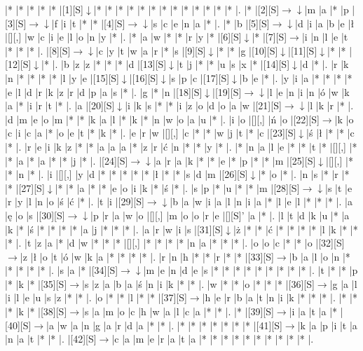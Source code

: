 \documentclass[11pt]{article}
\newcommand\drarr{$\rightarrow \!\!\!\!\! \downarrow$}
\newcommand\rarr{$\rightarrow$}
\newcommand\darr{$\downarrow$}
\begin{document}
\noindent\begin{Puzzle}{18}{33}|*	|*	|*	|*	|*	|[1][S]\darr	|*	|*	|*	|*	|*	|*	|*	|*	|*	|*	|*	|*	|*	|.
|*	|[2][S]\drarr	|m	|a	|*	|p	|[3][S]\drarr	|f	|i	|t	|*	|*	|[4][S]\drarr	|s	|c	|e	|n	|a	|*	|.
|*	|b	|[5][S]\drarr	|d	|i	|a	|b	|e	|ł	|[][,]{ }	|w	|c	|i	|e	|l	|o	|n	|y	|*	|.
|*	|a	|w	|*	|*	|r	|y	|*	|[6][S]\darr	|*	|[7][S]\rarr	|i	|n	|l	|e	|t	|*	|*	|*	|.
|[8][S]\drarr	|c	|y	|t	|w	|a	|r	|*	|s	|[9][S]\darr	|*	|*	|g	|[10][S]\darr	|[11][S]\darr	|*	|*	|[12][S]\darr	|*	|.
|b	|z	|z	|*	|*	|*	|d	|[13][S]\darr	|t	|j	|*	|*	|u	|s	|x	|*	|[14][S]\darr	|d	|*	|.
|r	|k	|n	|*	|*	|*	|*	|l	|y	|e	|[15][S]\darr	|[16][S]\darr	|s	|p	|c	|[17][S]\darr	|b	|e	|*	|.
|y	|i	|a	|*	|*	|*	|*	|e	|l	|d	|r	|k	|z	|r	|d	|p	|a	|s	|*	|.
|g	|*	|n	|[18][S]\darr	|[19][S]\drarr	|l	|e	|n	|i	|n	|ó	|w	|k	|a	|*	|i	|r	|t	|*	|.
|a	|[20][S]\darr	|i	|k	|s	|*	|*	|i	|z	|o	|d	|o	|a	|w	|[21][S]\drarr	|l	|k	|r	|*	|.
|d	|m	|e	|o	|m	|*	|*	|k	|a	|l	|*	|k	|*	|n	|w	|o	|a	|u	|*	|.
|i	|o	|[][,]{ }	|ń	|o	|[22][S]\rarr	|k	|o	|c	|i	|c	|a	|*	|o	|e	|t	|*	|k	|*	|.
|e	|r	|w	|[][,]{ }	|c	|*	|*	|w	|j	|t	|*	|c	|[23][S]\darr	|ś	|ł	|*	|*	|c	|*	|.
|r	|e	|i	|k	|z	|*	|*	|a	|a	|a	|*	|z	|r	|ć	|n	|*	|*	|y	|*	|.
|*	|n	|a	|l	|e	|*	|*	|t	|*	|[][,]{ }	|*	|*	|a	|*	|a	|*	|*	|j	|*	|.
|[24][S]\drarr	|a	|r	|a	|k	|*	|*	|e	|*	|p	|*	|*	|m	|[25][S]\darr	|[][,]{ }	|*	|*	|n	|*	|.
|i	|[][,]{ }	|y	|d	|*	|*	|*	|*	|*	|ł	|*	|*	|s	|d	|m	|[26][S]\darr	|*	|o	|*	|.
|n	|s	|*	|r	|*	|*	|[27][S]\darr	|*	|*	|a	|*	|*	|e	|o	|i	|k	|*	|ś	|*	|.
|s	|p	|*	|u	|*	|*	|m	|[28][S]\drarr	|s	|t	|e	|r	|y	|l	|n	|o	|ś	|ć	|*	|.
|t	|i	|[29][S]\drarr	|b	|a	|w	|i	|a	|l	|n	|i	|a	|*	|l	|e	|l	|*	|*	|*	|.
|a	|ę	|o	|s	|[30][S]\drarr	|p	|r	|a	|w	|o	|[][,]{ }	|m	|o	|o	|r	|e	|[][S]'	|a	|*	|.
|l	|t	|d	|k	|u	|*	|a	|k	|*	|ś	|*	|*	|*	|*	|a	|j	|*	|*	|*	|.
|a	|r	|w	|i	|s	|[31][S]\darr	|ż	|*	|*	|ć	|*	|*	|*	|*	|l	|k	|*	|*	|*	|.
|t	|z	|a	|*	|d	|w	|*	|*	|*	|[][,]{ }	|*	|*	|*	|*	|n	|a	|*	|*	|*	|.
|o	|o	|c	|*	|*	|o	|[32][S]\rarr	|z	|ł	|o	|t	|ó	|w	|k	|a	|*	|*	|*	|*	|.
|r	|n	|h	|*	|*	|r	|*	|*	|[33][S]\rarr	|b	|a	|l	|o	|n	|*	|*	|*	|*	|*	|.
|s	|a	|*	|[34][S]\drarr	|m	|e	|n	|d	|e	|s	|*	|*	|*	|*	|*	|*	|*	|*	|*	|.
|t	|*	|*	|p	|*	|k	|*	|[35][S]\rarr	|s	|z	|a	|b	|a	|ś	|n	|i	|k	|*	|*	|.
|w	|*	|*	|o	|*	|*	|*	|[36][S]\rarr	|g	|a	|l	|i	|l	|e	|u	|s	|z	|*	|*	|.
|o	|*	|*	|l	|*	|*	|[37][S]\rarr	|h	|e	|r	|b	|a	|t	|n	|i	|k	|*	|*	|*	|.
|*	|*	|*	|k	|*	|[38][S]\rarr	|s	|a	|m	|o	|c	|h	|w	|a	|l	|c	|a	|*	|*	|.
|*	|[39][S]\rarr	|i	|a	|t	|a	|*	|[40][S]\rarr	|a	|w	|a	|n	|g	|a	|r	|d	|a	|*	|*	|.
|*	|*	|*	|*	|*	|*	|*	|[41][S]\rarr	|k	|a	|p	|i	|t	|a	|n	|a	|t	|*	|*	|.
|[42][S]\rarr	|c	|a	|m	|e	|r	|a	|t	|a	|*	|*	|*	|*	|*	|*	|*	|*	|*	|*	|.\end{Puzzle}
\end{document}
